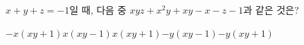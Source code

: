 $x+y+z=-1$일 때, 다음 중 $xyz+x^2y+xy-x-z-1$과 같은 것은?
\begin{choices32}{$-x(xy+1)$}{$x(xy-1)$}{$x(xy+1)$}{$-y(xy-1)$}{$-y(xy+1)$}\end{choices32}
